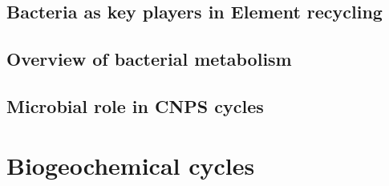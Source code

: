 \documentclass{article}
\begin{document}
\subsection{Bacteria as key players in Element recycling}



\subsection{Overview of bacterial metabolism}



\subsection{Microbial role in CNPS cycles}



\section{Biogeochemical cycles}
\end{document}

